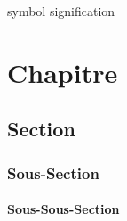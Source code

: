 \documentclass [memoire, letterpaper, oneside, fleqn,12pt]{thETS-latin1}
\begin{document}
\begin{listofsymbols}[3cm]
\item[symbol] signification
\end{listofsymbols}

\newpage
{}

\reversemarginpar %

\begin{introduction}

\end{introduction}

\chapter{Chapitre}
\section{Section}
\subsection{Sous-Section}
\subsubsection{Sous-Sous-Section}
%
%
%
%
%
%
%
%

\begin{conclusion}

\end{conclusion}

\begin{remerciements}

\end{remerciements}

\appendix
\multiannexe %
%


\renewcommand{\bibname}{RÉFÉRENCES BIBLIOGRAPHIQUES}

\end{document}
